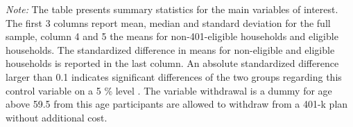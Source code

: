 \begin{scriptsize}
			\def\sym#1{\ifmmode^{#1}\else\(^{#1}\)\fi}
			\begin{ThreePartTable}
				\begin{TableNotes}
					\begin{scriptsize}
					\item \textit{Note:} The table presents summary statistics for the main variables of interest. The first 3 columns report mean, median and standard deviation for the full sample, column 4 and 5 the means for non-401-eligible households and eligible households. The standardized difference in means for non-eligible and eligible households is reported in the last column. An absolute standardized difference larger than 0.1 indicates significant differences of the two groups regarding this control variable on a 5 \% level \citep[see][]{standardized_difference}. The variable withdrawal is a dummy for age above 59.5 \textemdash from this age participants are allowed to withdraw from a 401-k plan without additional cost.
					\end{scriptsize}
				\end{TableNotes}
				

\end{ThreePartTable}
\end{scriptsize}
